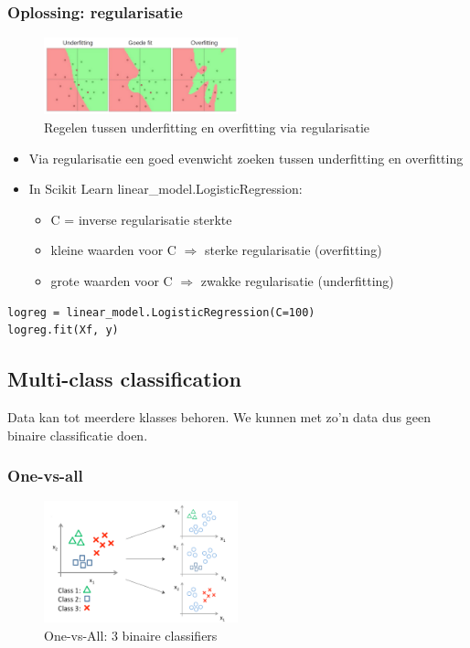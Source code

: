\documentclass{article}
\begin{document}
\subsubsection{Oplossing: regularisatie}

\begin{figure}[H]
    \centering
    \includegraphics[width=0.5\textwidth]{logistic-fitting.png}
    \caption{Regelen tussen underfitting en overfitting via regularisatie}
\end{figure}

\begin{itemize}
    \item Via regularisatie een goed evenwicht zoeken tussen underfitting en overfitting
    \item In Scikit Learn linear\_model.LogisticRegression:
    \begin{itemize}
        \item C = inverse regularisatie sterkte
        \item kleine waarden voor C $\Rightarrow$ sterke regularisatie (overfitting)
        \item grote waarden voor C $\Rightarrow$ zwakke regularisatie (underfitting)
    \end{itemize}
\end{itemize}

\begin{verbatim}
logreg = linear_model.LogisticRegression(C=100)
logreg.fit(Xf, y)
\end{verbatim}

\subsection{Multi-class classification}

Data kan tot meerdere klasses behoren.
We kunnen met zo'n data dus geen binaire classificatie doen.


\subsubsection{One-vs-all}

\begin{figure}[H]
    \centering
    \includegraphics[width=0.5\textwidth]{multi-class-classification.png}
    \caption{One-vs-All: 3 binaire classifiers}
\end{figure}
\end{document}
